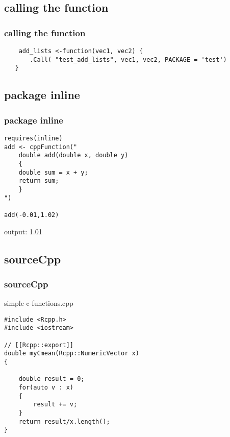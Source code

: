 \documentclass[hyperef={
    colorlinks=true,
    linkcolor=blue,
    filecolor=black,
urlcolor=blue}
]{beamer}
\begin{document}
\subsection{calling the function}
\begin{frame}[fragile]
\frametitle{calling the function}

\begin{verbatim}
    add_lists <-function(vec1, vec2) {
       .Call( "test_add_lists", vec1, vec2, PACKAGE = 'test')
   }
\end{verbatim}

\end{frame}

\subsection{package inline}
\begin{frame}[fragile]
\frametitle{package inline}
\begin{verbatim}
requires(inline)
add <- cppFunction("
    double add(double x, double y)
    {
    double sum = x + y;
    return sum;
    }
")

add(-0.01,1.02)
\end{verbatim}
output:
1.01
\end{frame}

\subsection{sourceCpp}
\begin{frame}[fragile]
\frametitle{sourceCpp}
simple-c-functions.cpp
\begin{verbatim}
#include <Rcpp.h>
#include <iostream>

// [[Rcpp::export]]
double myCmean(Rcpp::NumericVector x)
{
   
    double result = 0;
    for(auto v : x)
    {
        result += v;
    }
    return result/x.length();
}
\end{verbatim}
\end{frame}
\end{document}
